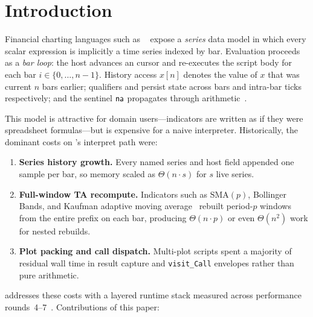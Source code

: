 \documentclass[11pt,a4paper]{article}
\begin{document}
\tableofcontents
\newpage

\section{Introduction}
\label{sec:intro}

Financial charting languages such as \pine{}~\citep{tradingview-pine} expose a
\emph{series} data model in which every scalar expression is implicitly a time
series indexed by bar.  Evaluation proceeds as a \emph{bar loop}: the host
advances an \ohlcv{} cursor and re-executes the script body for each bar $i\in
\{0,\ldots,n-1\}$.  History access $x[n]$ denotes the value of $x$ that was
current $n$ bars earlier; qualifiers  and  persist state
across bars and intra-bar ticks respectively; and the sentinel $\textsf{na}$
propagates through arithmetic~\citep{tradingview-pine,pynescript2026}.

This model is attractive for domain users---indicators are written as if they
were spreadsheet formulas---but is expensive for a naive interpreter.
Historically, the dominant costs on \pyne{}'s interpret path were:
\begin{enumerate}[leftmargin=*]
  \item \textbf{Series history growth.}  Every named series and host \ohlcv{}
        field appended one sample per bar, so memory scaled as
        $\Theta(n\cdot s)$ for $s$ live series.
  \item \textbf{Full-window TA recompute.}  Indicators such as
        $\mathrm{SMA}(p)$, Bollinger Bands, and Kaufman adaptive moving
        average~\citep{kama1998kaufman} rebuilt period-$p$ windows from the
        entire prefix on each bar, producing $\Theta(n\cdot p)$ or even
        $\Theta(n^2)$ work for nested rebuilds.
  \item \textbf{Plot packing and call dispatch.}  Multi-plot scripts spent a
        majority of residual wall time in result capture and
        \texttt{visit\_Call} envelopes rather than pure arithmetic.
\end{enumerate}

\pyne{} addresses these costs with a layered runtime stack measured across
performance rounds~4--7~\citep{pynescript2026}.  Contributions of this paper:
\end{document}
